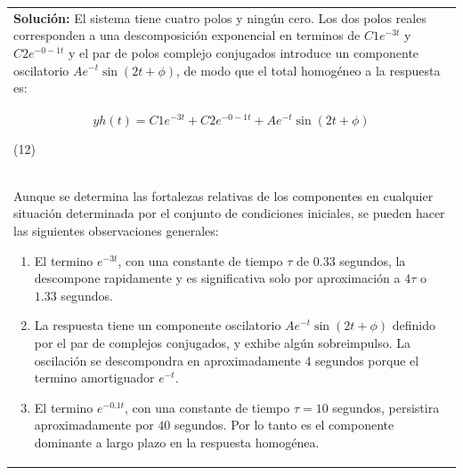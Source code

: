 \documentclass[10pt,a4paper]{article}
\begin{document}
\begin{center}
  \begin{tabular}{p{16cm}}
    \textbf{Solución:} El sistema tiene cuatro polos y ningún cero. Los dos polos reales corresponden a una descomposición exponencial en terminos de $C{\scriptscriptstyle 1}e^{-3t}$ y $C{\scriptscriptstyle 2}e^{-0-1t}$ y el par de polos complejo conjugados introduce un componente oscilatorio $Ae^{-t}\sin(2t+\phi)$, de modo que el total homogéneo a la respuesta es:\\
    \begin{center}
      \begin{center}
        \[y{\scriptscriptstyle h}(t)=C{\scriptscriptstyle 1}e^{-3t}+C{\scriptscriptstyle 2}e^{-0-1t}+Ae^{-t}\sin(2t+\phi)\]
      \end{center}
      \begin{minipage}{0.9\textwidth}
        \begin{flushright}
            (12)
        \end{flushright}
      \end{minipage}
    \end{center}
    \\
    Aunque se determina las fortalezas relativas de los componentes en cualquier situación determinada por el conjunto de condiciones iniciales, se pueden hacer las siguientes observaciones generales:
    \begin{enumerate}
      \item El termino $e^{-3t}$, con una constante de tiempo $\tau$ de $0.33$ segundos, la descompone rapidamente y es significativa solo por aproximación a $4\tau$ o $1.33$ segundos.
      \item La respuesta tiene un componente oscilatorio $Ae^{-t}\sin(2t+\phi)$ definido por el par de complejos conjugados, y exhibe algún sobreimpulso. La oscilación se descompondra en aproximadamente $4$ segundos porque el termino  amortiguador $e^{-t}$.
      \item El termino $e^{-0.1t}$, con una constante de tiempo $\tau=10$ segundos, persistira aproximadamente por $40$ segundos. Por lo tanto es el componente dominante a largo plazo en la respuesta homogénea.
    \end{enumerate}
    \\\hline
  \end{tabular}
\end{center}
\clearpage
\end{document}
